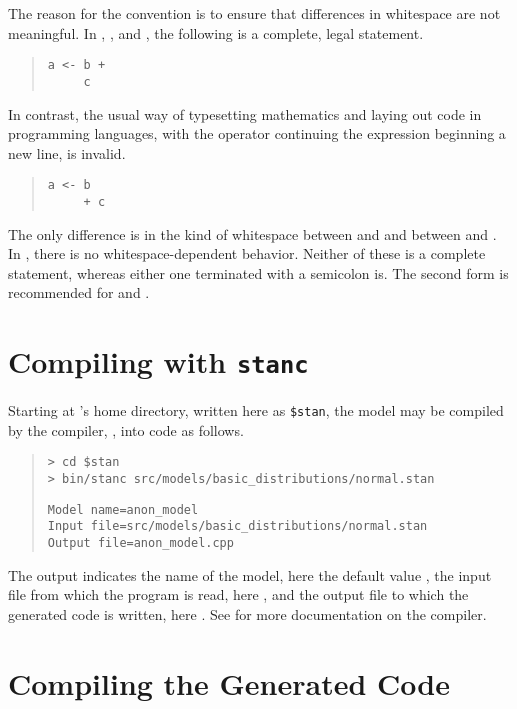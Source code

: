 The reason for the \Cpp convention is to ensure that differences in
whitespace are not meaningful.  In \R, \BUGS, and \JAGS, the following
is a complete, legal statement.
%
\begin{quote}
\begin{Verbatim}
a <- b +
     c
\end{Verbatim}
\end{quote}
%
In contrast, the usual way of typesetting mathematics and laying out
code in programming languages, with the operator continuing the
expression beginning a new line, is invalid.
%
\begin{quote}
\begin{Verbatim}
a <- b
     + c
\end{Verbatim}
\end{quote}
%
The only difference is in the kind of whitespace between  and
\code{+} and between \code{+} and .  In \Stan, there is no
whitespace-dependent behavior.  Neither of these is a complete
statement, whereas either one terminated with a semicolon is.  The
second form is recommended for \Cpp and \Stan.


\section{Compiling  with {\tt\bfseries stanc}}

Starting at \Stan's home directory, written here as {\tt \$stan},
the model may be compiled by the \Stan compiler, \stanc, into \Cpp code
as follows.
%
\begin{quote}
\begin{Verbatim}[fontshape=sl]
> cd $stan
> bin/stanc src/models/basic_distributions/normal.stan
\end{Verbatim}
%
\begin{Verbatim}
Model name=anon_model
Input file=src/models/basic_distributions/normal.stan
Output file=anon_model.cpp
\end{Verbatim}
\end{quote}
%
The output indicates the name of the model, here the default value
, the input file from which the \Stan program is
read, here , and the output file to which the
generated \Cpp code is written, here .  See
 for more documentation on the \stanc compiler.

\section{Compiling the Generated Code}

